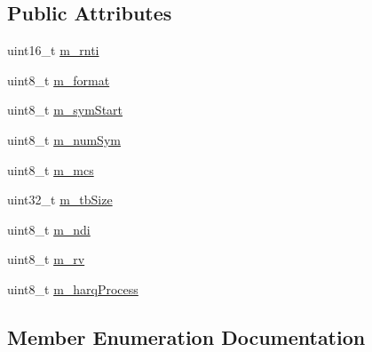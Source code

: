 \subsection*{Public Attributes}
\begin{DoxyCompactItemize}
\item 
uint16\+\_\+t \hyperlink{structns3_1_1DciInfoElementTdma_a8014e795e123c6e9843b3218c1029e58}{m\+\_\+rnti}
\item 
uint8\+\_\+t \hyperlink{structns3_1_1DciInfoElementTdma_aeda75e5efb543bd26da3fcc3405af165}{m\+\_\+format}
\item 
uint8\+\_\+t \hyperlink{structns3_1_1DciInfoElementTdma_a153e37d109766fd9da9537f4f118c946}{m\+\_\+sym\+Start}
\item 
uint8\+\_\+t \hyperlink{structns3_1_1DciInfoElementTdma_af4e642506d06a85b0f2358845f50ec5b}{m\+\_\+num\+Sym}
\item 
uint8\+\_\+t \hyperlink{structns3_1_1DciInfoElementTdma_af95ba660b14278b3346c7770fd48733d}{m\+\_\+mcs}
\item 
uint32\+\_\+t \hyperlink{structns3_1_1DciInfoElementTdma_a2cc720bbd0eae0cdd05186ef25b9a8e7}{m\+\_\+tb\+Size}
\item 
uint8\+\_\+t \hyperlink{structns3_1_1DciInfoElementTdma_ae51b91540a252ba806c78c7294392396}{m\+\_\+ndi}
\item 
uint8\+\_\+t \hyperlink{structns3_1_1DciInfoElementTdma_a2c54b3ea0c9210ab5ddc15dcf1236006}{m\+\_\+rv}
\item 
uint8\+\_\+t \hyperlink{structns3_1_1DciInfoElementTdma_a471e5c7d6afe00359a52a651ec0b3d5c}{m\+\_\+harq\+Process}
\end{DoxyCompactItemize}


\subsection{Member Enumeration Documentation}
